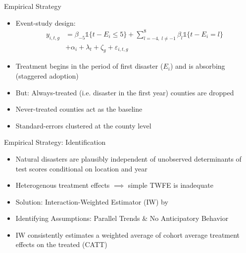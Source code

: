 \documentclass[hyperref={colorlinks = true,linkcolor = blue, citecolor=blue,urlcolor=blue}]{beamer}
\begin{document}
\begin{frame}{Empirical Strategy}
	\begin{itemize}
		\item Event-study design:
		\begin{align*}
			y_{i, t, g} &= \beta_{-5}  \mathds{1}\{t - E_i \leq 5\} + \sum_{l = -4, \; l \neq -1}^{8} \beta_l \mathds{1}\{t - E_i = l\} \\ &+ \alpha_i + \lambda_t + \zeta_g + \varepsilon_{i, t, g}
		\end{align*}
		\item Treatment begins in the period of first disaster ($E_i$) and is absorbing (staggered adoption)
		\item But: Always-treated (i.e. disaster in the first year) counties are dropped
		\item Never-treated counties act as the baseline
		\item Standard-errors clustered at the county level \citep{Abadie_2017, Sun_2021}
	\end{itemize}
\end{frame}

\begin{frame}{Empirical Strategy: Identification}
	\begin{itemize}
		\item Natural disasters are plausibly independent of unobserved determinants of test scores conditional on location and year
		\item Heterogenous treatment effects $\implies$ simple TWFE is inadequate \citep{deChaisemartin_2020, Sun_2021}
		\item Solution: Interaction-Weighted Estimator (IW) by \cite{Sun_2021}
		\item Identifying Assumptions: Parallel Trends \& No Anticipatory Behavior
		\item IW consistently estimates a weighted average of cohort average treatment effects on the treated (CATT)
	\end{itemize}
\end{frame}
\end{document}
